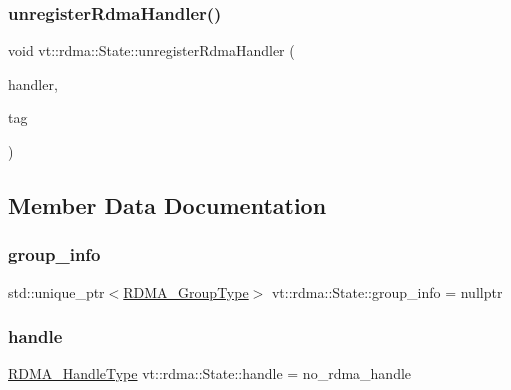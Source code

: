 \mbox{\label{structvt_1_1rdma_1_1_state_a03702b768cf198e89b9f0323c12d916c}} 
\subsubsection{\texorpdfstring{unregister\+Rdma\+Handler()}{unregisterRdmaHandler()}\hspace{0.1cm}{\footnotesize\ttfamily [2/2]}}
{\footnotesize\ttfamily void vt\+::rdma\+::\+State\+::unregister\+Rdma\+Handler (\begin{DoxyParamCaption}\item[{\hyperlink{namespacevt_a9530efb893c0f3846e8ac5f0507e0f49}{R\+D\+M\+A\+\_\+\+Handler\+Type} const \&}]{handler,  }\item[{\hyperlink{namespacevt_a84ab281dae04a52a4b243d6bf62d0e52}{Tag\+Type} const \&}]{tag }\end{DoxyParamCaption})}



\subsection{Member Data Documentation}
\mbox{\label{structvt_1_1rdma_1_1_state_ad8dc4c1a674c5a0b14789a53e54815d3}} 
\subsubsection{\texorpdfstring{group\+\_\+info}{group\_info}}
{\footnotesize\ttfamily std\+::unique\+\_\+ptr$<$\hyperlink{structvt_1_1rdma_1_1_state_aec26643b760f80a59e0c07c580e99ebc}{R\+D\+M\+A\+\_\+\+Group\+Type}$>$ vt\+::rdma\+::\+State\+::group\+\_\+info = nullptr}

\mbox{\label{structvt_1_1rdma_1_1_state_ac6ea5c9dffcc795713d1766b1c3e7028}} 
\subsubsection{\texorpdfstring{handle}{handle}}
{\footnotesize\ttfamily \hyperlink{namespacevt_a10442579ec4e7ebef223818e64bcf908}{R\+D\+M\+A\+\_\+\+Handle\+Type} vt\+::rdma\+::\+State\+::handle = no\+\_\+rdma\+\_\+handle}

